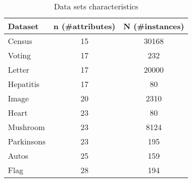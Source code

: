 \begin{table}
	\centering
	\begin{tabular}{ | l | c | c | }
		\hline
		Dataset & n (\#attributes) & N (\#instances) \\ \hline
		Census & 15 & 30168 \\ \hline
		Voting & 17 & 232 \\ \hline
		Letter & 17 & 20000 \\ \hline
		Hepatitis & 17 & 80 \\ \hline
		Image & 20 & 2310 \\ \hline
		Heart & 23 & 80 \\ \hline
		Mushroom & 23 & 8124 \\ \hline
		Parkinsons & 23 & 195 \\ \hline
		Autos & 25 & 159 \\ \hline
		Flag & 28 & 194 \\ \hline
	\end{tabular}
	\caption{Data sets characteristics}
	\label{tab:datasets}
\end{table}